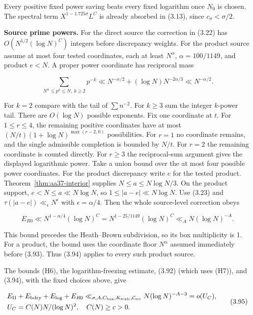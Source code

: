 Every positive fixed power saving beats every fixed logarithm once $N_0$ is chosen.
The spectral term $X^{1-1.725\sigma}L^C$ is already absorbed in (3.13), since $c_\sigma<\sigma/2$.

\textbf{Source prime powers.} For the direct source the correction in (3.22) has
$O(N^{1/2}(\log N)^C)$ integers before discrepancy weights.
For the product source assume at most four tested coordinates,
each at least $N^\alpha$, $\alpha=100/1149$, and product $e<N$.
A proper power coordinate has reciprocal mass

\[
\sum_{N^\alpha\le p^k\le N,\ k\ge2}p^{-k}
 \ll N^{-\alpha/2}+(\log N)N^{-2\alpha/3}
 \ll N^{-\alpha/2}.
\tag{3.93}
\]

For $k=2$ compare with the tail of $\sum n^{-2}$.
For $k\ge3$ sum the integer $k$-power tail.
There are $O(\log N)$ possible exponents.
Fix one coordinate at $t$.
For $1\le r\le4$, the remaining positive coordinates
have at most $(N/t)(1+\log N)^{\max(r-2,0)}$ possibilities.
For $r=1$ no coordinate remains, and the
single admissible completion is bounded by $N/t$.
For $r=2$ the remaining coordinate is counted directly.
For $r\ge3$ the reciprocal-sum argument gives the displayed logarithmic power.
Take a union bound over the at most four possible power coordinates.
For the product discrepancy write $e$ for the tested product.
Theorem~\ref{thm:aa37-interior} supplies $N\le a\le N\log N/3$.
On the product support, $e<N\le a\ll N\log N$, so
$1\le |a-e|\ll N\log N$.
Use (3.23) and $\tau(|a-e|)\ll_\epsilon N^\epsilon$ with
$\epsilon=\alpha/4$. Then the whole source-level correction obeys

\[
E_{R0}\ll N^{1-\alpha/4}(\log N)^C
       =N^{1-25/1149}(\log N)^C
       \ll_A N(\log N)^{-A}.
\tag{3.94}
\]

This bound precedes the Heath--Brown subdivision, so its box multiplicity is 1.
For a product, the bound uses the coordinate floor $N^\alpha$ assumed
immediately before (3.93).
Thus (3.94) applies to every such product source.

The bounds (H6), the logarithm-freezing estimate, (3.92) (which uses
(H7)), and (3.94), with the fixed choices above, give

\[
\begin{aligned}
&E_{\rm II}+E_{\rm bdry}+E_{\rm log}+E_{R0}
       \ll_{\sigma,A,C_{\rm box},K_{\rm scale},\mathcal C_{\rm src}}
       N(\log N)^{-A-3}=o(U_C),\\
&U_C=C(N)N/(\log N)^2,\quad C(N)\ge c>0.
\end{aligned}
\tag{3.95}
\]

